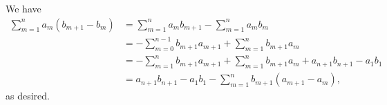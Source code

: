\Question{\currfilebase}

We have
\begin{align*}
    \sum_{m = 1}^{n} a_m (b_{m + 1} - b_m) & = \sum_{m = 1}^{n} a_m b_{m + 1} - \sum_{m = 1}^{n} a_m b_m                                              \\
                                           & = -\sum_{m = 0}^{n - 1} b_{m + 1} a_{m + 1} + \sum_{m = 1}^{n} b_{m + 1} a_m                             \\
                                           & = -\sum_{m = 1}^{n} b_{m + 1} a_{m + 1} + \sum_{m = 1}^{n} b_{m + 1} a_m + a_{n + 1} b_{n + 1} - a_1 b_1 \\
                                           & = a_{n + 1} b_{n + 1} - a_1 b_1 - \sum_{m = 1}^{n} b_{m + 1}(a_{m + 1} - a_m),
\end{align*}
as desired.

